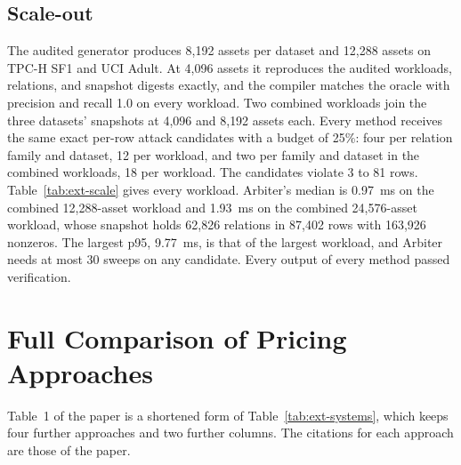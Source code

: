 \documentclass[10pt]{article}
\begin{document}


\subsection{Scale-out}
The audited generator produces 8{,}192 assets per dataset and 12{,}288 assets on TPC-H SF1 and UCI Adult. At 4{,}096 assets it reproduces the audited workloads, relations, and snapshot digests exactly, and the compiler matches the oracle with precision and recall 1.0 on every workload. Two combined workloads join the three datasets' snapshots at 4{,}096 and 8{,}192 assets each. Every method receives the same exact per-row attack candidates with a budget of 25\%: four per relation family and dataset, 12 per workload, and two per family and dataset in the combined workloads, 18 per workload. The candidates violate 3 to 81 rows. Table~\ref{tab:ext-scale} gives every workload. Arbiter's median is 0.97~ms on the combined 12{,}288-asset workload and 1.93~ms on the combined 24{,}576-asset workload, whose snapshot holds 62{,}826 relations in 87{,}402 rows with 163{,}926 nonzeros. The largest p95, 9.77~ms, is that of the largest workload, and Arbiter needs at most 30 sweeps on any candidate. Every output of every method passed verification.



\section{Full Comparison of Pricing Approaches}
Table~1 of the paper is a shortened form of Table~\ref{tab:ext-systems}, which keeps four further approaches and two further columns. The citations for each approach are those of the paper.
\end{document}
